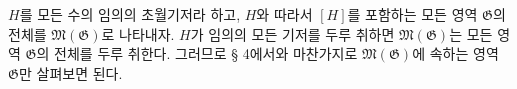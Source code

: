 
$H$를 모든 수의 임의의 초월기저라 하고, $H$와 따라서 $[H]$를 포함하는 모든 영역 $\mathfrak G$의 전체를 $\mathfrak M(\mathfrak G)$로 나타내자. $H$가 임의의 모든 기저를 두루 취하면 $\mathfrak M(\mathfrak G)$는 모든 영역 $\mathfrak G$의 전체를 두루 취한다. 그러므로 § 4에서와 마찬가지로 $\mathfrak M(\mathfrak G)$에 속하는 영역 $\mathfrak G$만 살펴보면 된다.
